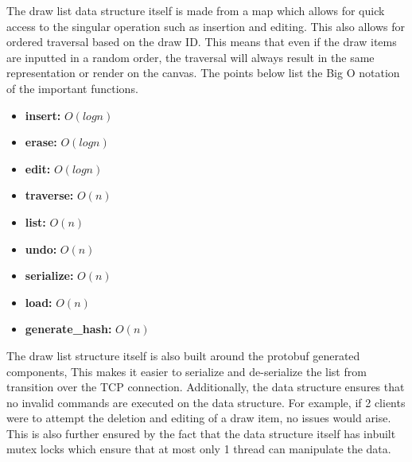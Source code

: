 \documentclass[12pt, a4paper]{report}
\begin{document}
The draw list data structure itself is made from a map which allows for quick access to the singular operation such as insertion and editing. This also allows for ordered traversal based on the draw ID. This means that even if the draw items are inputted in a random order, the traversal will always result in the same representation or render on the canvas. The points below list the Big O notation of the important functions.

\begin{itemize}
    \item \textbf{insert:} $O(log n)$
    \item \textbf{erase:} $O(log n)$
    \item \textbf{edit:} $O(log n)$
    \item \textbf{traverse:} $O(n)$
    \item \textbf{list:} $O(n)$
    \item \textbf{undo:} $O(n)$
    \item \textbf{serialize:} $O(n)$
    \item \textbf{load:} $O(n)$
    \item \textbf{generate\_hash:} $O(n)$
\end{itemize}

The draw list structure itself is also built around the protobuf generated components, This makes it easier to serialize and de-serialize the list from transition over the TCP connection. Additionally, the data structure ensures that no invalid commands are executed on the data structure. For example, if 2 clients were to attempt the deletion and editing of a draw item, no issues would arise. This is also further ensured by the fact that the data structure itself has inbuilt mutex locks which ensure that at most only 1 thread can manipulate the data.
\end{document}

